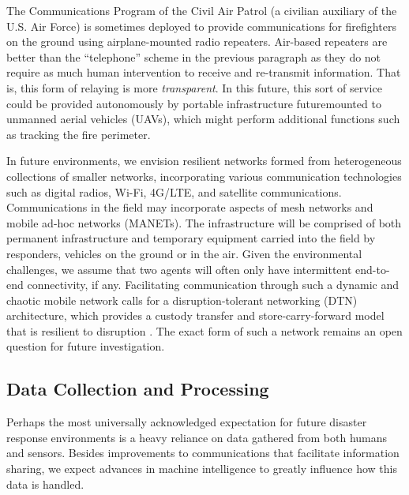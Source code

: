 \documentclass[]             %
{NASA}                       %
\theoremstyle{definition}
\begin{document}
The Communications Program of the Civil Air Patrol (a civilian
auxiliary of the U.S. Air Force) is sometimes deployed to provide
communications for firefighters on the ground using airplane-mounted
radio repeaters. Air-based repeaters are better than the ``telephone''
scheme in the previous paragraph as they do not require as much human
intervention to receive and re-transmit information. That is, this
form of relaying is more \emph{transparent}. In this future, this sort
of service could be provided autonomously by portable infrastructure
futuremounted to unmanned aerial vehicles (UAVs), which might perform
additional functions such as tracking the fire perimeter.

In future environments, we envision resilient networks formed from
heterogeneous collections of smaller networks, incorporating various
communication technologies such as digital radios, Wi-Fi, 4G/LTE, and
satellite communications. Communications in the field may incorporate
aspects of mesh networks and mobile ad-hoc networks (MANETs). The
infrastructure will be comprised of both permanent infrastructure and
temporary equipment carried into the field by responders, vehicles on
the ground or in the air. Given the environmental challenges, we
assume that two agents will often only have intermittent end-to-end
connectivity, if any. Facilitating communication through such a
dynamic and chaotic mobile network calls for a disruption-tolerant
networking (DTN) architecture, which provides a custody transfer and
store-carry-forward model that is resilient to disruption
\cite{2021:intro-dtn}. The exact form of such a network remains an
open question for future investigation.

\subsection{Data Collection and Processing}
\label{ssec:data-collection}
Perhaps the most universally acknowledged expectation for future
disaster response environments is a heavy reliance on data
gathered from both humans and sensors. Besides improvements to
communications that facilitate information sharing, we expect advances
in machine intelligence to greatly influence how this data is
handled.
\end{document}
